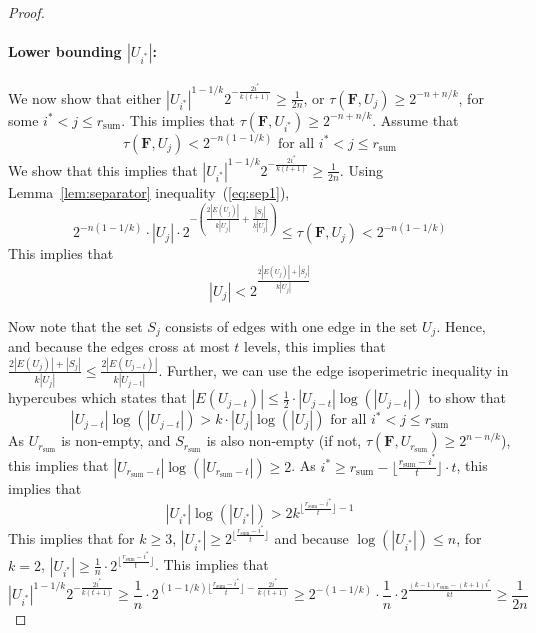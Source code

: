 \documentclass[11pt, letterpaper]{article}
\theoremstyle{definition}
\newcommand{\f}{\mathbf{F}}
\begin{document}
\begin{proof}
\paragraph{Lower bounding $|U_{i^*}|$: } We now show that either $|U_{i^*}|^{1-1/k}2^{-\frac{2 i^*}{k(t+1)}} \geq \frac{1}{2n}$, or $\tau(\f, U_j) \geq 2^{-n+n/k}$, for some $i^* < j \leq r_{\text{sum}}$. This implies that $\tau(\f, U_{i^*}) \geq 2^{-n+n/k}$. Assume that
\begin{equation}
    \tau(\f, U_{j}) < 2^{-n(1-1/k)} \text{ for all } i^* < j \leq r_{\text{sum}}
\end{equation}
We show that this implies that $|U_{i^*}|^{1-1/k}2^{-\frac{2 i^*}{k(t+1)}} \geq \frac{1}{2n}$. Using Lemma~\ref{lem:separator} inequality~(\ref{eq:sep1}), 
\begin{equation} \label{eqn:sum:contradiction}
    2^{-n(1-1/k)}\cdot |U_{j}| \cdot 2^{-\left(  \frac{2|E(U_{j})|}{k|U_{j}|}+\frac{|S_{j}|}{k|U_{j}|}\right)}\leq \tau(\f,U_{j}) <2^{-n(1-1/k)}
\end{equation}
\noindent
This implies that
\[|U_{j}| < 2^{ \frac{2|E(U_{j})| + |S_{j}|}{k|U_{j}|}} \]

\noindent
Now note that the set $S_j$ consists of edges with one edge in the set $U_j$. Hence, and because the edges cross at most $t$ levels, this implies that $\frac{2|E(U_{j})| + |S_{j}|}{k|U_{j}|} \leq \frac{2|E(U_{j-t})|}{k|U_{j-t}|}$. Further, we can use the edge isoperimetric inequality in hypercubes which states that $|E(U_{j-t})| \leq \frac{1}{2} \cdot |U_{j-t}|\log(|U_{j-t}|)$ to show that
\begin{equation*}
    |U_{j-t}| \log(|U_{j-t}|) > k \cdot |U_{j}| \log(|U_{j}|) \text{ for all }i^* < j \leq r_{\text{sum}}
\end{equation*}
As $U_{r_{\text{sum}}}$ is non-empty, and $S_{r_{\text{sum}}}$ is also non-empty (if not, $\tau(\f, U_{r_{\text{sum}}}) \geq 2^{n-n/k}$), this implies that $|U_{r_{\text{sum}}-t}| \log(|U_{r_{\text{sum}}-t}|) \geq 2$. As $i^* \geq r_{\text{sum}} - \lfloor \frac{r_{\text{sum}}-i^*}{t} \rfloor \cdot t$, this implies that
\[ |U_{i^*}| \log(|U_{i^*}|) > 2 k^{\lfloor\frac{r_{\text{sum}}-i^*}{t}\rfloor-1} \]
\noindent
This implies that for $k\geq 3$, $|U_{i^*}| \geq 2^{\lfloor\frac{r_{\text{sum}}-i^*}{t}\rfloor}$ and because $\log(|U_{i^*}|) \leq n$, for $k=2$, $|U_{i^*}| \geq \frac{1}{n} \cdot 2^{\lfloor\frac{r_{\text{sum}}-i^*}{t}\rfloor}$. This implies that
\[ |U_{i^*}|^{1-1/k}2^{-\frac{2 i^*}{k(t+1)}}\geq \frac{1}{n} \cdot 2^{\left(1-1/k\right)\lfloor\frac{r_{\text{sum}}-i^*}{t}\rfloor-\frac{2 i^*}{k(t+1)}} \geq 2^{-\left(1-1/k\right)} \cdot \frac{1}{n} \cdot 2^{\frac{(k-1)r_{\text{sum}}-(k+1)i^*}{kt}} \geq \frac{1}{2n}\]
\end{proof}
\noindent
\end{document}
